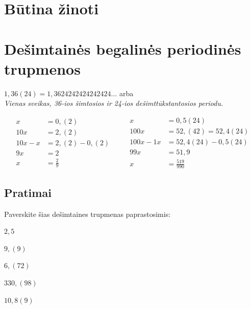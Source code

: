 \documentclass[fleqn]{article} %
\newenvironment{exercises}{\begin{enumerate*}[label=\alph*), itemjoin=\qquad]}{\end{enumerate*}}
\begin{document}

\renewcommand{\tablename}{Lentelė}
\renewcommand{\figurename}{Iliustracija}
\renewcommand{\vec}{\vv}
\pagestyle{plain}
\texttt{}


\section{Būtina žinoti}

% 

\section{Dešimtainės begalinės periodinės trupmenos} 
$1,36(24) = 1,3624242424242424 \dots$ arba \\
\textit{Vienas sveikas, 36-ios šimtosios ir 24-ios dešimttūkstantosios periodu.}

\begin{equation}
    \begin{aligned}
        x       &= 0,(2)        \\
        10x     &= 2,(2)        \\
        10x - x &= 2,(2) - 0,(2)\\
        9x      &= 2            \\ 
        x       &= \frac{2}{9}
      \end{aligned}
      \qquad
      \begin{aligned}
        x         &= 0,5(24)            \\
        100x      &= 52,(42) = 52,4(24) \\
        100x - 1x &= 52,4(24) - 0,5(24) \\ 
        99x       &= 51,9               \\
        x         &= \frac{519}{990} 
      \end{aligned}
  \end{equation}


\subsection{Pratimai}

Paverskite šias dešimtaines trupmenas paprastosimis: \\
\begin{exercises}
    \item $2,5      $
    \item $9,(9)    $
    \item $6,(72)   $
    \item $330,(98) $
    \item $10,8(9)  $ 
\end{exercises} 
\end{document}
